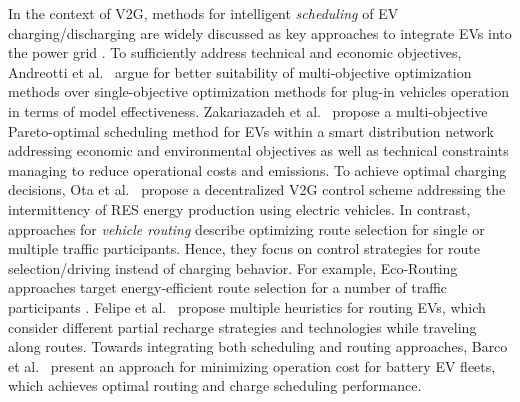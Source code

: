 In the context of V2G, methods for intelligent \textit{scheduling} of EV charging/discharging are widely discussed as key approaches to integrate EVs into the power grid 
\cite{yang2015computational}.
To sufficiently address technical and economic objectives, Andreotti et al.~\cite{andreotti2012review} argue for better suitability of multi-objective optimization methods over single-objective optimization methods for plug-in vehicles operation in terms of model effectiveness.
Zakariazadeh et al.~\cite{zakariazadeh2014multi} propose a multi-objective Pareto-optimal scheduling method for EVs within a smart distribution network addressing economic and environmental objectives as well as technical constraints managing to reduce operational costs and emissions.
To achieve optimal charging decisions, Ota et al.~\cite{ota2012autonomous} propose a decentralized V2G control scheme addressing the intermittency of RES energy production using electric vehicles. 
In contrast, approaches for \textit{vehicle routing} describe optimizing route selection for single or multiple traffic participants. Hence, they focus on control strategies for route selection/driving instead of charging behavior. 
For example, Eco-Routing approaches target energy-efficient route selection for a number of traffic participants \cite{ericsson2006optimizing}. 
Felipe et al.~\cite{felipe2014heuristic} propose multiple heuristics for routing EVs, which consider different partial recharge strategies and technologies while traveling along routes. 
Towards integrating both scheduling and routing approaches, Barco et al.~\cite{barco2013optimal} present an approach for minimizing operation cost for battery EV fleets, which achieves optimal routing and charge scheduling performance.

